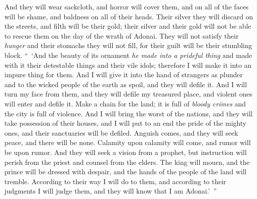 \begin{biblechapter}
\verse And they will wear sackcloth, and horror will cover them, and on all of the faces will be shame, and baldness on all of their heads.
\verse Their silver they will discard on the streets, and filth will be their gold; their silver and their gold will not be able to rescue them on the day of the wrath of Adonai. They will not satisfy their \textit{hunger} and their stomachs they will not fill, for their guilt will be their stumbling block.
 “ ‘And the beauty of its ornament \textit{he made into a prideful thing} and made with it their detestable things and their vile idols; therefore I will make it into an impure thing for them.
\verse And I will give it into the hand of strangers as plunder and to the wicked people of the earth as spoil, and they will defile it.
\verse And I will turn my face from them, and they will defile my treasured place, and violent ones will enter and defile it.
\verse Make a chain for the land; it is full of \textit{bloody crimes} and the city is full of violence.
\verse And I will bring the worst of the nations, and they will take possession of their houses, and I will put to an end the pride of the mighty ones, and their sanctuaries will be defiled.
\verse Anguish comes, and they will seek peace, and there will be none.
\verse Calamity upon calamity will come, and rumor will be upon rumor. And they will seek a vision from a prophet, but instruction will perish from the priest and counsel from the elders.
\verse The king will mourn, and the prince will be dressed with despair, and the hands of the people of the land will tremble. According to their way I will do to them, and according to their judgments I will judge them, and they will know that I am Adonai.’ ”
\end{biblechapter}

